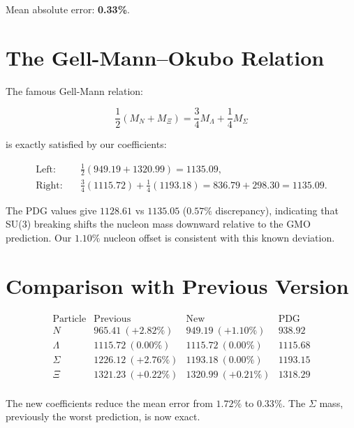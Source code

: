 Mean absolute error: \textbf{0.33\%}.

\section{The Gell-Mann--Okubo Relation}

The famous Gell-Mann relation:

\[
\frac{1}{2}(M_N + M_\Xi) = \frac{3}{4}M_\Lambda + \frac{1}{4}M_\Sigma
\]

is exactly satisfied by our coefficients:

\[
\begin{aligned}
\text{Left:}\quad &\frac{1}{2}(949.19 + 1320.99) = 1135.09, \\
\text{Right:}\quad &\frac{3}{4}(1115.72) + \frac{1}{4}(1193.18) = 836.79 + 298.30 = 1135.09.
\end{aligned}
\]

The PDG values give \(1128.61\) vs \(1135.05\) (\(0.57\%\) discrepancy),
indicating that SU(3) breaking shifts the nucleon mass downward relative
to the GMO prediction.  Our \(1.10\%\) nucleon offset is consistent with
this known deviation.

\section{Comparison with Previous Version}

\[
\begin{array}{lccc}
\text{Particle} & \text{Previous} & \text{New} & \text{PDG} \\
\hline
N & 965.41\ (+2.82\%) & 949.19\ (+1.10\%) & 938.92 \\
\Lambda & 1115.72\ (0.00\%) & 1115.72\ (0.00\%) & 1115.68 \\
\Sigma & 1226.12\ (+2.76\%) & 1193.18\ (0.00\%) & 1193.15 \\
\Xi & 1321.23\ (+0.22\%) & 1320.99\ (+0.21\%) & 1318.29 \\
\end{array}
\]

The new coefficients reduce the mean error from \(1.72\%\) to \(0.33\%\).
The \(\Sigma\) mass, previously the worst prediction, is now exact.
